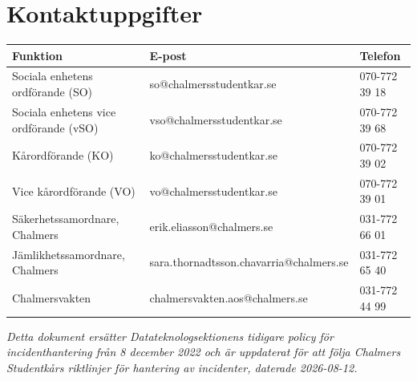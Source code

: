 \section{Kontaktuppgifter}
\begin{center}
\renewcommand{\arraystretch}{1.3}
\small
\begin{tabular}{@{}p{6.1cm} p{5.9cm} p{2.6cm}@{}}
\toprule
\rowcolor{headshade}\textbf{Funktion} & \textbf{E-post} & \textbf{Telefon} \\
\midrule
Sociala enhetens ordförande (SO) & so@chalmersstudentkar.se & 070-772 39 18 \\
Sociala enhetens vice ordförande (vSO) & vso@chalmersstudentkar.se & 070-772 39 68 \\
Kårordförande (KO) & ko@chalmersstudentkar.se & 070-772 39 02 \\
Vice kårordförande (VO) & vo@chalmersstudentkar.se & 070-772 39 01 \\
Säkerhetssamordnare, Chalmers & erik.eliasson@chalmers.se & 031-772 66 01 \\
Jämlikhetssamordnare, Chalmers & sara.thornadtsson.chavarria@chalmers.se & 031-772 65 40 \\
Chalmersvakten & chalmersvakten.aos@chalmers.se & 031-772 44 99 \\
\bottomrule
\end{tabular}
\end{center}

\vspace{0.4cm}
\noindent\textit{Detta dokument ersätter Datateknologsektionens tidigare policy för incidenthantering från 8 december 2022 och är uppdaterat för att följa Chalmers Studentkårs riktlinjer för hantering av incidenter, daterade 2026-08-12.}



